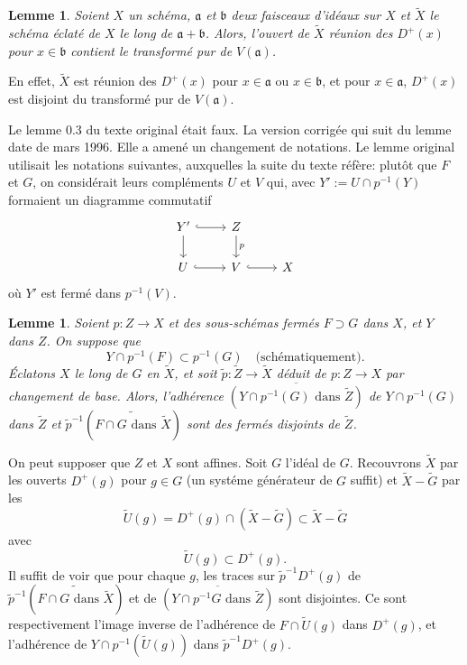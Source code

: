 \documentclass[11pt,a4paper]{article}
\theoremstyle{plain}
\newtheorem{lemma}[theorem]{Lemme}
\theoremstyle{definition}
\begin{document}
\begin{lemma}
Soient $X$ un sch\'ema, $\mathfrak{a}$ et $\mathfrak{b}$ deux faisceaux d'id\'eaux sur $X$ et $\widetilde{X}$ le sch\'ema \'eclat\'e de $X$ le long de $\mathfrak{a}+\mathfrak{b}$. Alors, l'ouvert de $\widetilde{X}$ r\'eunion des $D^+(x)$ pour $x \in \mathfrak{b}$ contient le transform\'e pur de $V(\mathfrak{a})$.
\end{lemma}

En effet, $\widetilde{X}$ est r\'eunion des $D^+(x)$ pour $x \in \mathfrak{a}$ ou $x \in \mathfrak{b}$, et pour $x \in \mathfrak{a}$, $D^+(x)$ est disjoint du transform\'e pur de $V(\mathfrak{a})$.

\bigskip
Le lemme 0.3 du texte original \'etait faux. La version corrig\'ee qui suit du lemme date de mars 1996. Elle a amen\'e un changement de notations. Le lemme original utilisait les notations suivantes, auxquelles la suite du texte r\'ef\`ere: plut\^ot que $F$ et $G$, on consid\'erait leurs compl\'ements $U$ et $V$ qui, avec $Y' := U \cap p^{-1}(Y)$ formaient un diagramme commutatif
\[
\begin{tikzcd}
Y' \arrow[d] \arrow[r, hook] & Z \arrow[d, "p"] \\
U \arrow[r, hook] & V \arrow[r, hook] & X
\end{tikzcd}
\]
o\`u $Y'$ est ferm\'e dans $p^{-1}(V)$.

\begin{lemma}
Soient $p: Z \to X$ et des sous-sch\'emas ferm\'es $F \supset G$ dans $X$, et $Y$ dans $Z$. On suppose que
\[ Y \cap p^{-1}(F) \subset p^{-1}(G) \quad \text{(sch\'ematiquement).} \]
\'Eclatons $X$ le long de $G$ en $\widetilde{X}$, et soit $\tilde{p}: \widetilde{Z} \to \widetilde{X}$ d\'eduit de $p: Z \to X$ par changement de base. Alors, l'adh\'erence $\overline{(Y \cap p^{-1}(G) \text{ dans } \widetilde{Z})}$ de $Y \cap p^{-1}(G)$ dans $\widetilde{Z}$ et $\tilde{p}^{-1}(\widetilde{F \cap G \text{ dans } \widetilde{X}})$ sont des ferm\'es disjoints de $\widetilde{Z}$.
\end{lemma}

On peut supposer que $Z$ et $X$ sont affines. Soit $G$ l'id\'eal de $G$. Recouvrons $\widetilde{X}$ par les ouverts $D^+(g)$ pour $g \in G$ (un syst\'eme g\'en\'erateur de $G$ suffit) et $\widetilde{X} - \widetilde{G}$ par les
\[
\widetilde{U}(g) = D^+(g) \cap (\widetilde{X} - \widetilde{G}) \subset \widetilde{X} - \widetilde{G}
\]
avec
\[
\widetilde{U}(g) \subset D^+(g).
\]
Il suffit de voir que pour chaque $g$, les traces sur $\tilde{p}^{-1}D^+(g)$ de $\tilde{p}^{-1}(\widetilde{F \cap G \text{ dans } \widetilde{X}})$ et de $\overline{(Y \cap p^{-1}G \text{ dans } \widetilde{Z})}$ sont disjointes. Ce sont respectivement l'image inverse de l'adh\'erence de $F \cap \widetilde{U}(g)$ dans $D^+(g)$, et l'adh\'erence de $Y \cap p^{-1}(\widetilde{U}(g))$ dans $\tilde{p}^{-1}D^+(g)$.
\end{document}
